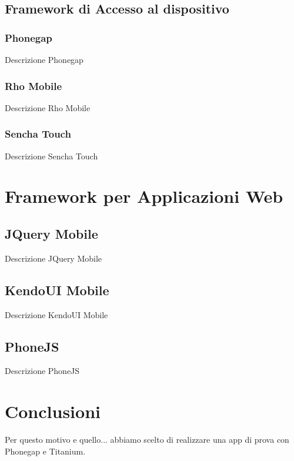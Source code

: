 		\subsection{Framework di Accesso al dispositivo}
	
			\subsubsection{Phonegap}
				Descrizione Phonegap
	
			\subsubsection{Rho Mobile}
				Descrizione Rho Mobile
	
			\subsubsection{Sencha Touch}
				Descrizione Sencha Touch
	
	\section{Framework per Applicazioni Web}
	\label{sec:frameworkwebapp}
	
		\subsection{JQuery Mobile}
			Descrizione JQuery Mobile
	
		\subsection{KendoUI Mobile}
			Descrizione KendoUI Mobile
	
		\subsection{PhoneJS}
			Descrizione PhoneJS

	\section{Conclusioni}
		Per questo motivo e quello... abbiamo scelto di realizzare una app di 
		prova con Phonegap e Titanium.
